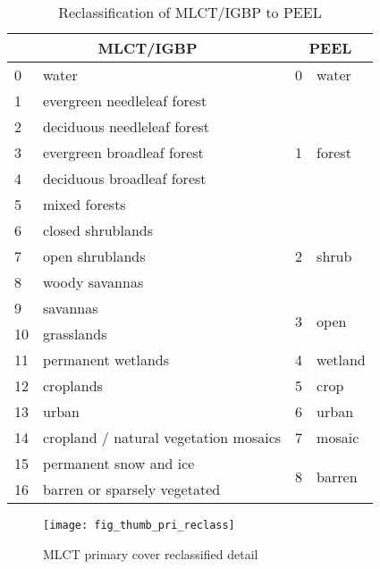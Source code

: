 \begin{center}
  \begin{table}[htbp]
    \begin{tabular}{|l|l|l|l|}
      \hline
      \multicolumn{2}{|c|}{MLCT/IGBP} & \multicolumn{2}{|c|}{PEEL} \\
      \hline
      0 & water & 0 & water \\
      \hline
      1 & evergreen needleleaf forest & \multirow{5}{*}{1} & \multirow{5}{*}{forest} \\
      2 & deciduous needleleaf forest & & \\
      3 & evergreen broadleaf forest & & \\
      4 & deciduous broadleaf forest & & \\
      5 & mixed forests & & \\
      \hline
      6 & closed shrublands & \multirow{3}{*}{2} & \multirow{3}{*}{shrub} \\
      7 & open shrublands & & \\
      8 & woody savannas & & \\
      \hline
      9 & savannas & \multirow{2}{*}{3} & \multirow{2}{*}{open} \\
      10 & grasslands & & \\
      \hline
      11 & permanent wetlands & 4 & wetland \\
      \hline
      12 & croplands & 5 & crop \\
      \hline
      13 & urban & 6 & urban \\
      \hline
      14 & cropland / natural vegetation mosaics & 7 & mosaic \\
      \hline
      15 & permanent snow and ice & \multirow{2}{*}{8} & \multirow{2}{*}{barren} \\
      16 & barren or sparsely vegetated & & \\  
      \hline
    \end{tabular}
    \caption{Reclassification of MLCT/IGBP to PEEL}
    \label{tab:mlct_reclass}
  \end{table}
\end{center}




\begin{figure}[hpt] 
  \centering
  

\texttt{[image: fig\_thumb\_pri\_reclass]}
\caption{MLCT primary cover reclassified detail} 
\label{fig:thumb_pri_reclass} 
\end{figure} 

